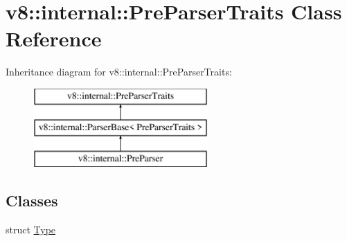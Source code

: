 \hypertarget{classv8_1_1internal_1_1_pre_parser_traits}{}\section{v8\+:\+:internal\+:\+:Pre\+Parser\+Traits Class Reference}
\label{classv8_1_1internal_1_1_pre_parser_traits}
Inheritance diagram for v8\+:\+:internal\+:\+:Pre\+Parser\+Traits\+:\begin{figure}[H]
\begin{center}
\leavevmode
\includegraphics[height=3.000000cm]{classv8_1_1internal_1_1_pre_parser_traits}
\end{center}
\end{figure}
\subsection*{Classes}
\begin{DoxyCompactItemize}
\item 
struct \hyperlink{structv8_1_1internal_1_1_pre_parser_traits_1_1_type}{Type}
\end{DoxyCompactItemize}
